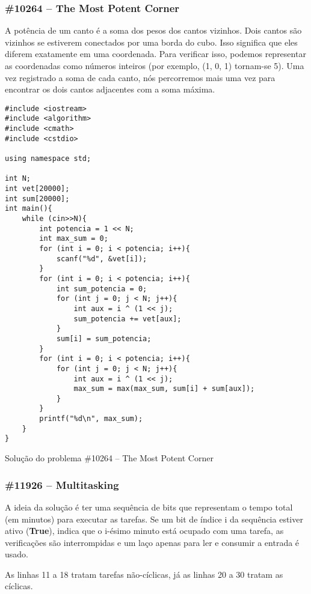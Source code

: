 \documentclass[a4paper,12pt]{scrartcl}
\begin{document}
\subsubsection{\#10264 – The Most Potent Corner}
A potência de um canto é a soma dos pesos dos cantos vizinhos. Dois cantos são vizinhos se estiverem conectados por uma borda do cubo. Isso significa que eles diferem exatamente em uma coordenada. Para verificar isso, podemos representar as coordenadas como números inteiros (por exemplo, (1, 0, 1) tornam-se 5). Uma vez registrado a soma de cada canto, nós percorremos mais uma vez para encontrar os dois cantos adjacentes com a soma máxima. 
\begin{listing}[H]
\begin{verbatim}
#include <iostream>
#include <algorithm>
#include <cmath>
#include <cstdio>

using namespace std;

int N;
int vet[20000];
int sum[20000];
int main(){
    while (cin>>N){
        int potencia = 1 << N;
        int max_sum = 0;
        for (int i = 0; i < potencia; i++){
            scanf("%d", &vet[i]);
        }
        for (int i = 0; i < potencia; i++){
            int sum_potencia = 0;
            for (int j = 0; j < N; j++){
                int aux = i ^ (1 << j);
                sum_potencia += vet[aux];
            }
            sum[i] = sum_potencia;
        }
        for (int i = 0; i < potencia; i++){
            for (int j = 0; j < N; j++){
                int aux = i ^ (1 << j);
                max_sum = max(max_sum, sum[i] + sum[aux]);
            }
        }
        printf("%d\n", max_sum);
    }
}
\end{verbatim}
\caption{\footnotesize{Solução do problema \#10264 – The Most Potent Corner}}
\end{listing}

\subsubsection{\#11926 – Multitasking}
A ideia da solução é ter uma sequência de bits que representam o tempo total (em minutos) para executar as tarefas. Se um bit de índice i da sequência estiver ativo (\textbf{True}), indica que o i-ésimo minuto está ocupado com uma tarefa, as verificações são interrompidas e um laço apenas para ler e consumir a entrada é usado.

As linhas 11 a 18 tratam tarefas não-cíclicas, já as linhas 20 a 30 tratam as cíclicas.
\end{document}
